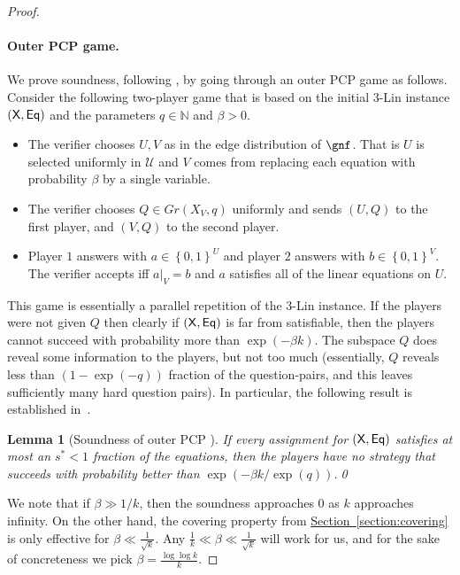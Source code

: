 \documentclass[11pt]{article}
\numberwithin{equation}{section}
\newtheorem{lemma}[theorem]{Lemma}
\theoremstyle{definition}
\theoremstyle{plain}
\newcommand{\expref}[2]{\hyperref[#2]{#1~\ref{#2}}}
\newcommand\set[1]{{\left\{ #1 \right\}}}
\newcommand\power[1]{\set{0,1}^{#1}}
\def\U{\mathcal{U}}
\begin{document}
\begin{proof}
\paragraph{Outer PCP game.}
We prove soundness, following \cite{KMS}, by going through an outer PCP game as follows. Consider
the following two-player game that is based on the initial 3-Lin instance $({\sf X,Eq})$
and the parameters $q\in\mathbb{N}$ and $\beta>0$.%
\begin{itemize}
  \item The verifier chooses $U,V$ as in the edge distribution of
    $\gnf$. That is  $U$ is selected uniformly in $\U$ and $V$ comes from replacing each equation with probability $\beta$ by a single variable.
  \item The verifier chooses $Q\in Gr(X_V,q)$ uniformly and sends $(U,Q)$ to the first player, and $(V,Q)$ to the second player.
  \item Player $1$ answers with $a\in\power U$ and player $2$ answers with $b\in \power V$. The verifier accepts iff $a|_V=b$ and $a$ satisfies all of the linear equations on $U$.
\end{itemize}
This game is essentially a parallel repetition of the 3-Lin instance. If the players were not given $Q$ then clearly if $\sf (X,Eq)$ is far from satisfiable, then the players cannot succeed with probability more than
$\exp(-\beta k)$.
%
The subspace $Q$ does reveal some information to the players, but not too much (essentially, $Q$ reveals less than $(1-\exp(-q))$ fraction of the question-pairs, and this leaves sufficiently many hard question pairs).
In particular, the following result is established in~\cite[Section 3.4]{KMS}. %
%
\begin{lemma}[Soundness of outer PCP \cite{KMS}]\label{lem:outer}  %
If every assignment for $\sf (X,Eq)$ satisfies at most an $s^*<1$ fraction of the equations, then the players have no strategy that succeeds with probability better than
$\exp(-\beta k/\exp(q))$.\qed %
%
\end{lemma}
We note that if $\beta\gg 1/k$, then the soundness approaches $0$ as $k$ approaches infinity.
On the other hand, the covering property from \expref{Section}{section:covering} is only effective for $\beta\ll \frac{1}{\sqrt{k}}$.
Any $\frac{1}{k}\ll \beta\ll \frac{1}{\sqrt{k}}$ will work for us, and for the sake of concreteness
we pick $\beta = \frac{\log\log k}{k}$. %


\end{proof}
\end{document}
